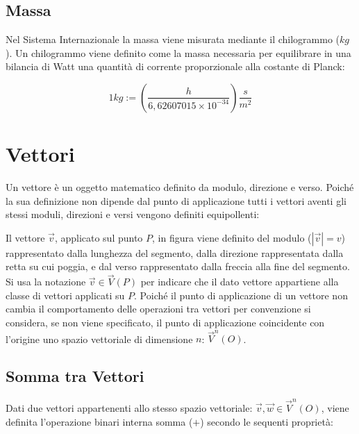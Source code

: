 \documentclass{article}
\numberwithin{equation}{subsection}
\begin{document}
\subsection{Massa}
Nel Sistema Internazionale la massa viene misurata mediante 
il chilogrammo ($kg$). Un chilogrammo viene definito come la 
massa necessaria per equilibrare in una bilancia di Watt una 
quantità di corrente proporzionale alla costante di Planck:

\begin{equation}
    1kg := \left(\displaystyle\frac{ h}{ 6{,}62607015 \times 10^{-34}}\right)\frac{\displaystyle s}{\displaystyle m^{2}}
\end{equation}
\clearpage

\section{Vettori}
Un vettore è un oggetto matematico definito da modulo, direzione e verso. Poich\'{e} la sua definizione non dipende dal punto di applicazione tutti i vettori aventi gli stessi moduli, direzioni e versi vengono definiti equipollenti:

\begin{center}\end{center}

Il vettore $\vec{v}$, applicato sul punto $P$, in figura viene definito del modulo ($|\vec{v}| = v$) rappresentato dalla lunghezza del segmento, dalla direzione rappresentata dalla retta su cui poggia, e dal verso rappresentato dalla freccia alla fine del segmento.
Si usa la notazione $\vec{v}\in\vec{V}{\left(P\right)}$ per indicare che  il dato vettore appartiene alla classe di vettori applicati su $P$. Poich\'{e} il punto di applicazione di un vettore non cambia il comportamento delle operazioni tra vettori per convenzione si considera, se non viene specificato, il punto di applicazione coincidente con l'origine uno spazio vettoriale di dimensione $n$: $\vec{V}^{n}\left(O\right)$.

\subsection{Somma tra Vettori}
Dati due vettori appartenenti allo stesso spazio vettoriale: $\vec{v}, \vec{w} \in \vec{V}^{n}\left(O\right)$, viene definita l'operazione binari interna somma ($+$) secondo le sequenti proprietà:
\end{document}
